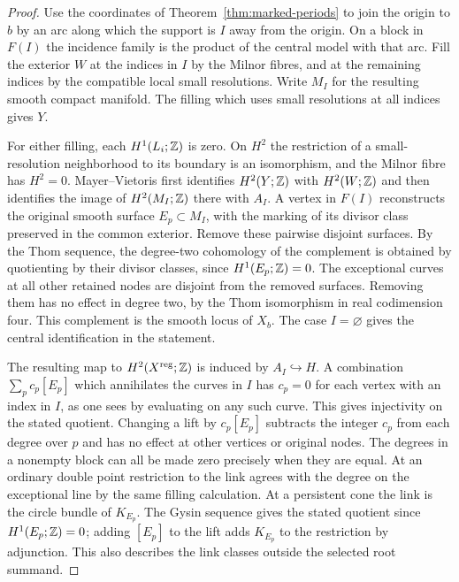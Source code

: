 \begin{proof}
Use the coordinates of Theorem~\ref{thm:marked-periods} to join the
origin to $b$ by an arc along which the support is $I$ away from the
origin. On a block in $F(I)$ the incidence family is the product of
the central model with that arc. Fill the exterior $W$ at the
indices in $I$ by the Milnor fibres, and at the remaining indices
by the compatible local small resolutions. Write $M_I$ for the
resulting smooth compact manifold. The filling which uses small
resolutions at all indices gives $Y$.

For either filling, each $H^1(L_i;\mathbb Z)$ is zero. On $H^2$ the
restriction of a small-resolution neighborhood to its boundary is an
isomorphism, and the Milnor fibre has $H^2=0$. Mayer--Vietoris first
identifies $H^2(Y;\mathbb Z)$ with $H^2(W;\mathbb Z)$ and then identifies the
image of $H^2(M_I;\mathbb Z)$ there with $A_I$. A vertex in $F(I)$
reconstructs the original smooth surface $E_p\subset M_I$, with
the marking of its divisor class preserved in the common exterior.
Remove these pairwise disjoint surfaces. By the Thom sequence,
the degree-two cohomology of the complement is obtained by quotienting
by their divisor classes, since $H^1(E_p;\mathbb Z)=0$. The exceptional
curves at all other retained nodes are disjoint from the removed
surfaces. Removing them has no effect in degree two, by the Thom
isomorphism in real codimension four. This complement is the smooth
locus of $X_b$. The case $I=\varnothing$ gives the central
identification in the statement.

The resulting map to $H^2(X^{\rm reg};\mathbb Z)$ is induced by
$A_I\hookrightarrow H$. A combination $\sum_pc_p[E_p]$ which
annihilates the curves in $I$ has $c_p=0$ for each vertex with an
index in $I$, as one sees by evaluating on any such curve. This
gives injectivity on the stated quotient. Changing a lift by
$c_p[E_p]$ subtracts the integer $c_p$ from each degree over $p$
and has no effect at other vertices or original nodes. The degrees
in a nonempty block can all be made zero precisely when they are
equal. At an ordinary double point restriction to the link agrees
with the degree on the exceptional line by the same filling calculation.
At a persistent cone the link is the circle bundle of $K_{E_p}$.
The Gysin sequence gives the stated quotient since $H^1(E_p;\mathbb Z)=0$;
adding $[E_p]$ to the lift adds $K_{E_p}$ to the restriction by adjunction.
This also describes the link classes outside the selected root summand.
\end{proof}

